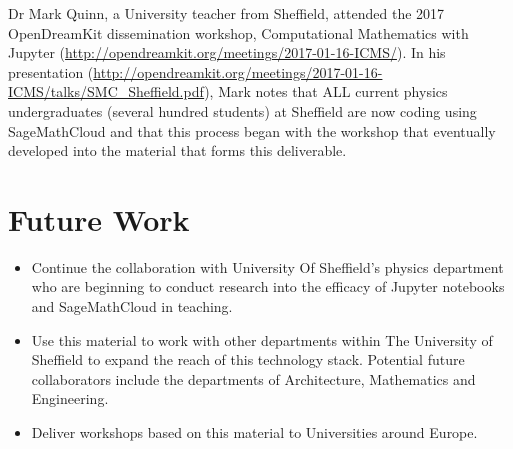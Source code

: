\documentclass{deliverablereport}
\begin{document}
Dr Mark Quinn, a University teacher from Sheffield, attended the 2017 OpenDreamKit dissemination workshop, Computational Mathematics with Jupyter (\url{http://opendreamkit.org/meetings/2017-01-16-ICMS/}). In his presentation (\url{http://opendreamkit.org/meetings/2017-01-16-ICMS/talks/SMC_Sheffield.pdf}), Mark notes that ALL current physics undergraduates (several hundred students) at Sheffield are now coding using SageMathCloud and that this process began with the workshop that eventually developed into the material that forms this deliverable.
\section{Future Work}
\begin{itemize}
\item Continue the collaboration with University Of Sheffield's physics department who are beginning to conduct research into the efficacy of Jupyter notebooks and SageMathCloud in teaching.
\item Use this material to work with other departments within The University of Sheffield to expand the reach of this technology stack. Potential future collaborators include the departments of Architecture, Mathematics and Engineering.
\item Deliver workshops based on this material to Universities around Europe.
\end{itemize}


\printbibliography
\end{document}

